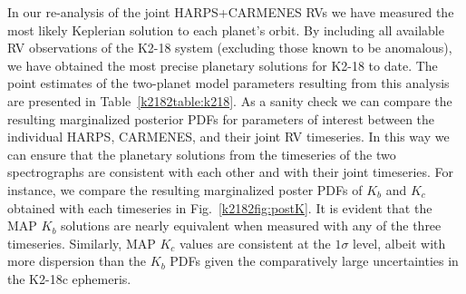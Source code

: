In our re-analysis of the joint HARPS+CARMENES RVs we have measured the most likely Keplerian solution to each planet's
orbit. By including all available RV observations of the K2-18 system (excluding those  known to be anomalous),
we have obtained the most precise planetary solutions for K2-18 to date.
The point estimates of the two-planet model parameters resulting
from this analysis are presented in Table~\ref{k2182table:k218}. As a sanity check we can compare the resulting marginalized
posterior PDFs for parameters of interest between the individual HARPS, CARMENES, and their joint RV timeseries. In this way
we can ensure that the planetary solutions from the timeseries of the two spectrographs  are consistent with each other 
and with their joint timeseries. For instance, we compare the resulting marginalized poster PDFs of $K_b$ and
$K_c$ obtained with each timeseries in Fig.~\ref{k2182fig:postK}. It is evident that the MAP $K_b$ solutions are nearly
equivalent when measured with any of the three timeseries. Similarly, MAP $K_c$ values are consistent at the $1\sigma$
level, albeit with more dispersion than the $K_b$ PDFs given the comparatively large uncertainties in the K2-18c
ephemeris.

